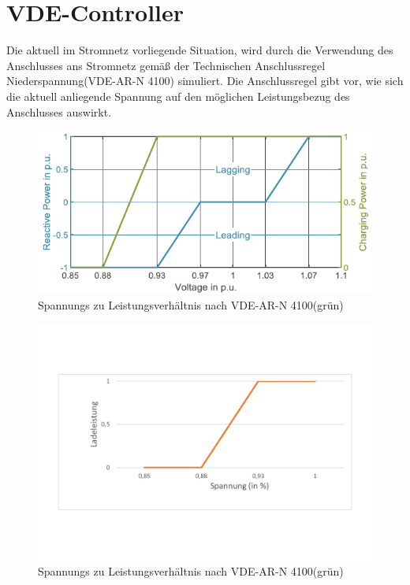 \section{VDE-Controller}
\label{cap:background_sec:pureVDE}
Die aktuell im Stromnetz vorliegende Situation, wird durch die Verwendung des Anschlusses ans Stromnetz gemäß der Technischen Anschlussregel Niederspannung(VDE-AR-N 4100) simuliert. Die Anschlussregel gibt vor, wie sich die aktuell anliegende Spannung auf den möglichen Leistungsbezug des Anschlusses auswirkt. \\
\begin{figure}[h!]
	\includegraphics[width=\linewidth]{img/VDEGraph.png}
	\caption{Spannungs zu Leistungsverhältnis nach VDE-AR-N 4100(grün)}
	\label{Abb_VDEController}
\end{figure}
\begin{figure}[h!]
	\includegraphics[width=\linewidth]{img/Dia2.pdf}
	\caption{Spannungs zu Leistungsverhältnis nach VDE-AR-N 4100(grün)}
	\label{Abb_VDEController2}
\end{figure}
